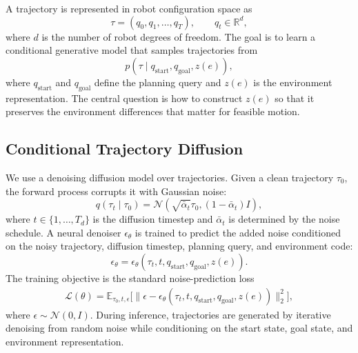 A trajectory is represented in robot configuration space as
%
\begin{equation}
\tau=(q_0,q_1,\ldots,q_T), \qquad q_t\in\mathbb{R}^{d},
\end{equation}
%
where $d$ is the number of robot degrees of freedom. The goal is to learn a conditional generative model that samples trajectories from
%
\begin{equation}
p(\tau \mid q_{\mathrm{start}}, q_{\mathrm{goal}}, z(e)),
\end{equation}
%
where $q_{\mathrm{start}}$ and $q_{\mathrm{goal}}$ define the planning query and $z(e)$ is the environment representation. The central question is how to construct $z(e)$ so that it preserves the environment differences that matter for feasible motion.

\subsection{Conditional Trajectory Diffusion}

We use a denoising diffusion model over trajectories. Given a clean trajectory $\tau_0$, the forward process corrupts it with Gaussian noise:
%
\begin{equation}
q(\tau_t \mid \tau_0)
=
\mathcal{N}
\left(
\sqrt{\bar{\alpha}_t}\tau_0,
(1-\bar{\alpha}_t)I
\right),
\end{equation}
%
where $t\in\{1,\ldots,T_d\}$ is the diffusion timestep and $\bar{\alpha}_t$ is determined by the noise schedule. A neural denoiser $\epsilon_\theta$ is trained to predict the added noise conditioned on the noisy trajectory, diffusion timestep, planning query, and environment code:
%
\begin{equation}
\epsilon_\theta
=
\epsilon_\theta(
\tau_t,
t,
q_{\mathrm{start}},
q_{\mathrm{goal}},
z(e)
).
\end{equation}
%
The training objective is the standard noise-prediction loss
%
\begin{equation}
\begin{split}
\mathcal{L}(\theta)
=
\mathbb{E}_{\tau_0,t,\epsilon}
\big[
\big\|
\epsilon -
\epsilon_\theta(
\tau_t,
t,
q_{\mathrm{start}},
q_{\mathrm{goal}},
z(e)
)
\big\|_2^2
\big],
\end{split}
\end{equation}
%
where $\epsilon\sim\mathcal{N}(0,I)$. During inference, trajectories are generated by iterative denoising from random noise while conditioning on the start state, goal state, and environment representation.

